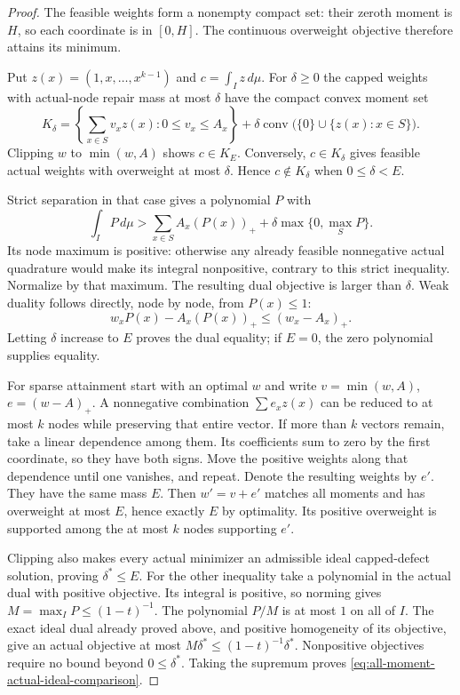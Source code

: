 \documentclass[11pt]{article}
\theoremstyle{definition}
\begin{document}
\begin{proof}
The feasible weights form a nonempty compact set: their
zeroth moment is $H$, so each coordinate is in $[0,H]$.
The continuous overweight objective therefore attains its
minimum.

Put $z(x)=(1,x,\ldots,x^{k-1})$ and $c=\int_I z\,d\mu$.
For $\delta\ge0$ the capped weights with actual-node repair
mass at most $\delta$ have the compact convex moment set
\[
 K_\delta=
 \left\{\sum_{x\in S}v_xz(x):0\le v_x\le A_x\right\}
 +\delta\operatorname{conv}\bigl(\{0\}\cup\{z(x):x\in S\}\bigr).
\]
Clipping $w$ to $\min(w,A)$ shows $c\in K_E$.
Conversely, $c\in K_\delta$ gives feasible actual weights
with overweight at most $\delta$. Hence $c\notin K_\delta$
when $0\le\delta<E$.

Strict separation in that case gives a polynomial $P$ with
\[
 \int_I P\,d\mu>
       \sum_{x\in S}A_x(P(x))_+
             +\delta\max\{0,\max_S P\}.
\]
Its node maximum is positive: otherwise any already feasible
nonnegative actual quadrature would make its integral
nonpositive, contrary to this strict inequality.
Normalize by that maximum. The resulting dual objective is
larger than $\delta$. Weak duality follows directly, node by
node, from $P(x)\le1$:
\[
 w_xP(x)-A_x(P(x))_+\le(w_x-A_x)_+.
\]
Letting $\delta$ increase to $E$ proves the dual equality;
if $E=0$, the zero polynomial supplies equality.

For sparse attainment start with an optimal $w$ and write
$v=\min(w,A)$, $e=(w-A)_+$. A nonnegative combination
$\sum e_xz(x)$ can be reduced to at most $k$ nodes while
preserving that entire vector. If more than $k$ vectors
remain, take a linear dependence among them. Its coefficients
sum to zero by the first coordinate, so they have both signs.
Move the positive weights along that dependence until one
vanishes, and repeat. Denote the resulting weights by $e'$.
They have the same mass $E$. Then $w'=v+e'$ matches all
moments and has overweight at most $E$, hence exactly $E$
by optimality. Its positive overweight is supported among
the at most $k$ nodes supporting $e'$.

Clipping also makes every actual minimizer an admissible
ideal capped-defect solution, proving $\delta^*\le E$.
For the other inequality take a polynomial in the actual
dual with positive objective. Its integral is positive, so
norming gives $M=\max_I P\le(1-t)^{-1}$.
The polynomial $P/M$ is at most $1$ on all of $I$.
The exact ideal dual already proved above, and positive
homogeneity of its objective, give an actual objective at
most $M\delta^*\le(1-t)^{-1}\delta^*$.
Nonpositive objectives require no bound beyond $0\le\delta^*$.
Taking the supremum proves
\eqref{eq:all-moment-actual-ideal-comparison}.
\end{proof}
\end{document}

